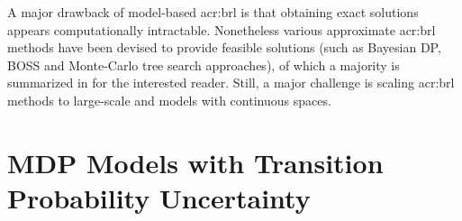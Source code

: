 A major drawback of model-based \acrshort{acr:brl} is that obtaining exact solutions appears computationally intractable.
Nonetheless various approximate \acrshort{acr:brl} methods have been devised to provide feasible solutions (such as Bayesian DP, BOSS and Monte-Carlo tree search approaches), of which a majority is summarized in \cite{ghavamzadeh2015bayesian} for the interested reader.
Still, a major challenge is scaling \acrshort{acr:brl} methods to large-scale  and models with continuous spaces.



\section{MDP Models with Transition Probability Uncertainty}
\label{sec:mdp-uncertain-probabilities}


